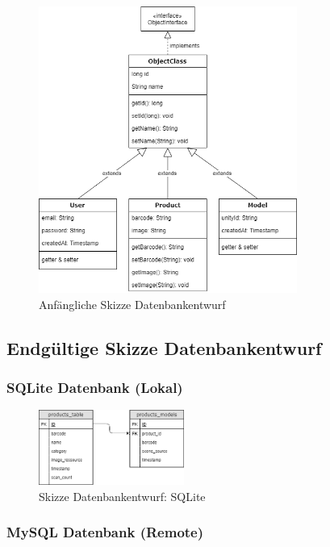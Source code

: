 \documentclass{scrartcl}
\begin{document}
\begin{figure}[h]
\centering
\includegraphics[width=320px]{img/Skizze_Java_1.png}
\caption{Anfängliche Skizze Datenbankentwurf}
\end{figure}

\newpage

\subsection{Endgültige Skizze Datenbankentwurf}

\subsubsection{SQLite Datenbank (Lokal)}

\begin{figure}[h]
\centering
\includegraphics[width=180px]{img/Skizze_Datenbank_SQLite.png}
\caption{Skizze Datenbankentwurf: SQLite}
\end{figure}

\subsubsection{MySQL Datenbank (Remote)}
\end{document}
